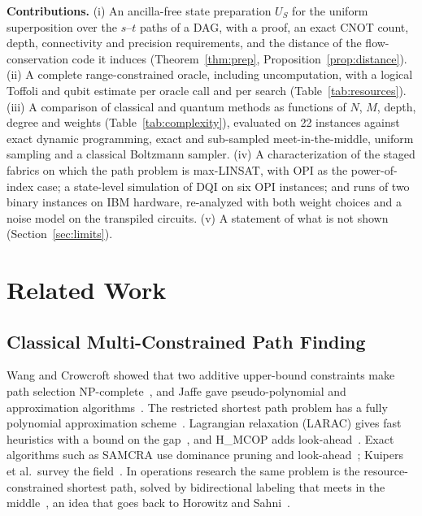 \documentclass[journal]{IEEEtran}
\begin{document}
\textbf{Contributions.}
(i) An ancilla-free state preparation $U_{S}$ for the uniform superposition over the $s$--$t$ paths of a DAG, with a proof, an exact CNOT count, depth, connectivity and precision requirements, and the distance of the flow-conservation code it induces (Theorem~\ref{thm:prep}, Proposition~\ref{prop:distance}).
(ii) A complete range-constrained oracle, including uncomputation, with a logical Toffoli and qubit estimate per oracle call and per search (Table~\ref{tab:resources}).
(iii) A comparison of classical and quantum methods as functions of $N$, $M$, depth, degree and weights (Table~\ref{tab:complexity}), evaluated on 22 instances against exact dynamic programming, exact and sub-sampled meet-in-the-middle, uniform sampling and a classical Boltzmann sampler.
(iv) A characterization of the staged fabrics on which the path problem is max-LINSAT, with OPI as the power-of-index case; a state-level simulation of DQI on six OPI instances; and runs of two binary instances on IBM hardware, re-analyzed with both weight choices and a noise model on the transpiled circuits.
(v) A statement of what is not shown (Section~\ref{sec:limits}).


\section{Related Work}

\subsection{Classical Multi-Constrained Path Finding}

Wang and Crowcroft showed that two additive upper-bound constraints make path selection NP-complete~\cite{wang1996}, and Jaffe gave pseudo-polynomial and approximation algorithms~\cite{jaffe1984}. The restricted shortest path problem has a fully polynomial approximation scheme~\cite{hassin1992}. Lagrangian relaxation (LARAC) gives fast heuristics with a bound on the gap~\cite{juttner2001}, and H\_MCOP adds look-ahead~\cite{korkmaz2001}. Exact algorithms such as SAMCRA use dominance pruning and look-ahead~\cite{vanmieghem2004}; Kuipers et al.\ survey the field~\cite{kuipers2002}. In operations research the same problem is the resource-constrained shortest path, solved by bidirectional labeling that meets in the middle~\cite{righini2006}, an idea that goes back to Horowitz and Sahni~\cite{horowitz1974}.
\end{document}
